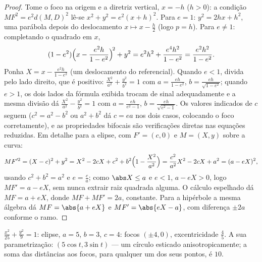 \begin{proof}
Tome o foco na origem e a diretriz vertical, $x = -h$ ($h > 0$): a
condição $MF^2 = e^2 d(M, D)^2$ lê-se $x^2 + y^2 =
e^2 (x + h)^2$. Para $e = 1$: $y^2 = 2hx + h^2$, uma parábola depois
do deslocamento $x \mapsto x - \frac h2$ (logo $p = h$). Para $e \neq 1$: completando o
quadrado em $x$,
\[
(1 - e^2)\Bigl(x - \frac{e^2 h}{1 - e^2}\Bigr)^{\!2} + y^2
= e^2h^2 + \frac{e^4 h^2}{1 - e^2}
= \frac{e^2 h^2}{1 - e^2} .
\]
Ponha $X = x - \frac{e^2h}{1-e^2}$ (um deslocamento do referencial). Quando $e < 1$, divida
pelo lado direito, que é positivo: $\frac{X^2}{a^2} + \frac{y^2}{b^2} = 1$ com $a = \frac{eh}{1 -
e^2}$, $b = \frac{eh}{\sqrt{1-e^2}}$; quando
$e > 1$, os dois lados da fórmula exibida trocam de sinal
adequadamente e a mesma divisão dá $\frac{X^2}{a^2} - \frac{y^2}{b^2} = 1$ com $a = \frac{eh}{e^2 -
1}$, $b = \frac{eh}{\sqrt{e^2 - 1}}$. Os valores
indicados de $c$ seguem ($c^2 = a^2 - b^2$ ou $a^2 + b^2$ dá $c = ea$ nos dois casos,
colocando o foco corretamente), e as propriedades bifocais são
verificações diretas nas equações reduzidas. Em detalhe para a
elipse, com $F' = (c, 0)$ e $M = (X, y)$ sobre a curva:
\[
MF'^2 = (X - c)^2 + y^2
= X^2 - 2cX + c^2 + b^2\Bigl(1 - \frac{X^2}{a^2}\Bigr)
= \frac{c^2}{a^2}X^2 - 2cX + a^2
= (a - eX)^2 ,
\]
usando $c^2 + b^2 = a^2$ e $e = \frac ca$; como $\abs X \leq
a$ e $e < 1$, $a - eX > 0$, logo $MF' = a - eX$, sem
nunca extrair raiz quadrada alguma. O cálculo espelhado dá $MF = a + eX$,
donde $MF + MF' = 2a$, constante. Para a hipérbole a mesma álgebra dá $MF = \abs{a + eX}$ e
$MF' = \abs{eX - a}$, com diferença $\pm2a$ conforme o ramo.
\end{proof}

\begin{example}\label{ex:b1:curves:conicexample}
$\frac{x^2}{25} + \frac{y^2}{9} = 1$: elipse, $a = 5$, $b = 3$, $c = 4$: focos $(\pm4, 0)$, excentricidade
$\frac45$. A sua parametrização: $(5\cos t, 3\sin t)$ --- um círculo esticado
anisotropicamente; a soma das distâncias aos focos, para qualquer um
dos seus pontos, é $10$.
\end{example}

